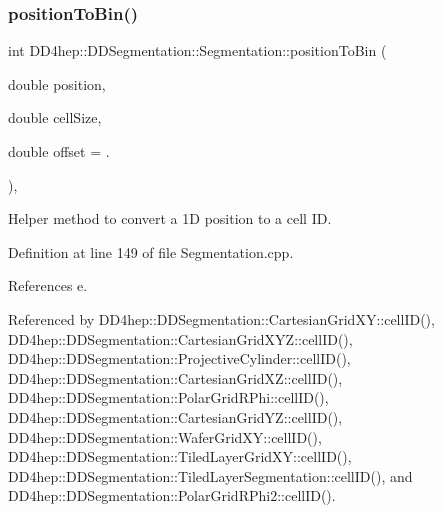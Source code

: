 \subsubsection{\texorpdfstring{position\+To\+Bin()}{positionToBin()}\hspace{0.1cm}{\footnotesize\ttfamily [1/2]}}
{\footnotesize\ttfamily int D\+D4hep\+::\+D\+D\+Segmentation\+::\+Segmentation\+::position\+To\+Bin (\begin{DoxyParamCaption}\item[{double}]{position,  }\item[{double}]{cell\+Size,  }\item[{double}]{offset = {.} }\end{DoxyParamCaption})\hspace{0.3cm}{\ttfamily [static]}, {\ttfamily [protected]}}



Helper method to convert a 1D position to a cell ID. 



Definition at line 149 of file Segmentation.\+cpp.



References e.



Referenced by D\+D4hep\+::\+D\+D\+Segmentation\+::\+Cartesian\+Grid\+X\+Y\+::cell\+I\+D(), D\+D4hep\+::\+D\+D\+Segmentation\+::\+Cartesian\+Grid\+X\+Y\+Z\+::cell\+I\+D(), D\+D4hep\+::\+D\+D\+Segmentation\+::\+Projective\+Cylinder\+::cell\+I\+D(), D\+D4hep\+::\+D\+D\+Segmentation\+::\+Cartesian\+Grid\+X\+Z\+::cell\+I\+D(), D\+D4hep\+::\+D\+D\+Segmentation\+::\+Polar\+Grid\+R\+Phi\+::cell\+I\+D(), D\+D4hep\+::\+D\+D\+Segmentation\+::\+Cartesian\+Grid\+Y\+Z\+::cell\+I\+D(), D\+D4hep\+::\+D\+D\+Segmentation\+::\+Wafer\+Grid\+X\+Y\+::cell\+I\+D(), D\+D4hep\+::\+D\+D\+Segmentation\+::\+Tiled\+Layer\+Grid\+X\+Y\+::cell\+I\+D(), D\+D4hep\+::\+D\+D\+Segmentation\+::\+Tiled\+Layer\+Segmentation\+::cell\+I\+D(), and D\+D4hep\+::\+D\+D\+Segmentation\+::\+Polar\+Grid\+R\+Phi2\+::cell\+I\+D().

\hypertarget{class_d_d4hep_1_1_d_d_segmentation_1_1_segmentation_a9357e76769306a1bf6f92c8a5d8eb6b4}{}\label{class_d_d4hep_1_1_d_d_segmentation_1_1_segmentation_a9357e76769306a1bf6f92c8a5d8eb6b4} 
